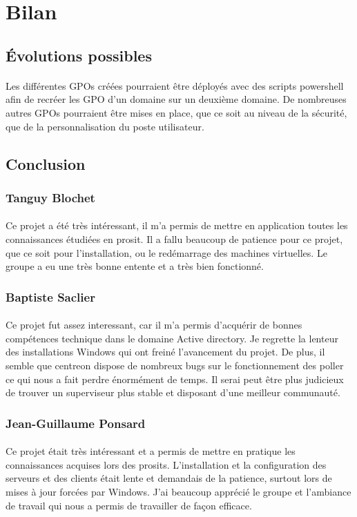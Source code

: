 \section{Bilan}
	\subsection{Évolutions possibles}
		\paragraph{}
			Les différentes GPOs créées pourraient être déployés avec des scripts powershell afin de recréer les GPO d'un domaine sur un deuxième domaine. De nombreuses autres GPOs pourraient être mises en place, que ce soit au niveau de la sécurité, que de la personnalisation du poste utilisateur.
	\subsection{Conclusion}
		\subsubsection{Tanguy Blochet}
			\paragraph{}
				Ce projet a été très intéressant, il m'a permis de mettre en application toutes les connaissances étudiées en prosit. Il a fallu beaucoup de patience pour ce projet, que ce soit pour l'installation, ou le redémarrage des machines virtuelles. Le groupe a eu une très bonne entente et a très bien fonctionné.
		\subsubsection{Baptiste Saclier}
			\paragraph{}
			Ce projet fut assez interessant, car il m'a permis d'acquérir de bonnes compétences technique dans le domaine Active directory. Je regrette la lenteur des installations Windows qui ont freiné l'avancement du projet.
			De plus, il semble que centreon dispose de nombreux bugs sur le fonctionnement des poller ce qui nous a fait perdre énormément de temps.
			Il serai peut être plus judicieux de trouver un superviseur plus stable et disposant d'une meilleur communauté.
		\subsubsection{Jean-Guillaume Ponsard}
			\paragraph{}
				Ce projet était très intéressant et a permis de mettre en pratique les connaissances acquises lors des prosits. L'installation et la configuration des serveurs et des clients était lente et demandais de la patience, surtout lors de mises à jour forcées par Windows. J'ai beaucoup apprécié le groupe et l'ambiance de travail qui nous a permis de travailler de façon efficace.
